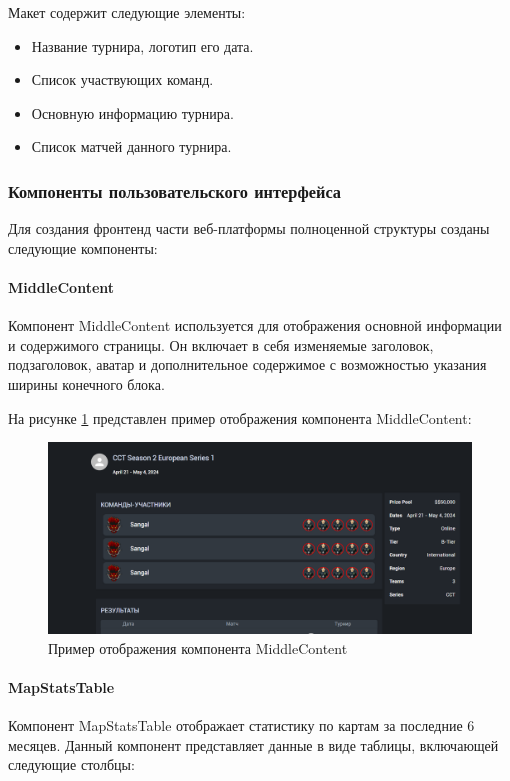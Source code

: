 Макет содержит следующие элементы:
\begin{itemize}
	\item Название турнира, логотип его дата.
	\item Список участвующих команд.
	\item Основную информацию турнира.
	\item Список матчей данного турнира.
\end{itemize}

\subsubsection{Компоненты пользовательского интерфейса}

Для создания фронтенд части веб-платформы полноценной структуры созданы следующие компоненты:

\paragraph{MiddleContent}

Компонент MiddleContent используется для отображения основной информации и содержимого страницы. Он включает в себя изменяемые заголовок, подзаголовок, аватар и дополнительное содержимое с возможностью указания ширины конечного блока. 

На рисунке \ref{fig:MiddleContent} представлен пример отображения компонента MiddleContent:
\begin{figure}
	\centering
	\includegraphics[width=0.95\linewidth]{images/MiddleContent}
	\caption{Пример отображения компонента MiddleContent}
	\label{fig:MiddleContent}
\end{figure}

\paragraph{MapStatsTable}

Компонент MapStatsTable отображает статистику по картам за последние 6 месяцев. Данный компонент представляет данные в виде таблицы, включающей следующие столбцы:

